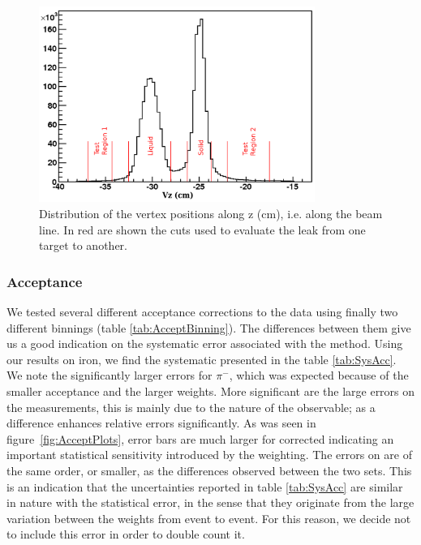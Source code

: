 \begin{figure}[tbp]
\centering
\includegraphics[width=9cm] {chap5-fig/Vertex.png}
\caption {Distribution of the vertex positions along z (cm), i.e. along the 
beam line. In red are shown the cuts used to evaluate the leak from one target to 
another.}
\label{fig:targetleak}
\end{figure}

\subsubsection{Acceptance}

We tested several different acceptance corrections to the data using finally 
two different binnings 
(table \ref{tab:AcceptBinning}). The differences between them give us a good 
indication on the systematic error associated with the method. Using our
results on iron, we find the systematic presented in the table 
\ref{tab:SysAcc}. We note the significantly larger errors for $\pi^-$, which 
was expected because of the smaller acceptance and the larger weights. More 
significant are the large errors on the \dpt measurements, this is mainly due to 
the nature of the observable; as a difference \dpt enhances relative errors 
significantly. As was seen in figure~\ref{fig:AcceptPlots}, error bars are much 
larger for corrected \dpt indicating an important statistical 
sensitivity introduced by the weighting. The errors on \dpt are of the same 
order, or smaller, as the differences observed between the two sets. This is 
an indication that the uncertainties reported in table \ref{tab:SysAcc} are 
similar in nature with the statistical error, in the sense that they originate
from the large variation between the weights from event to event. For this
reason, we decide not to include this error in order to double count it.

